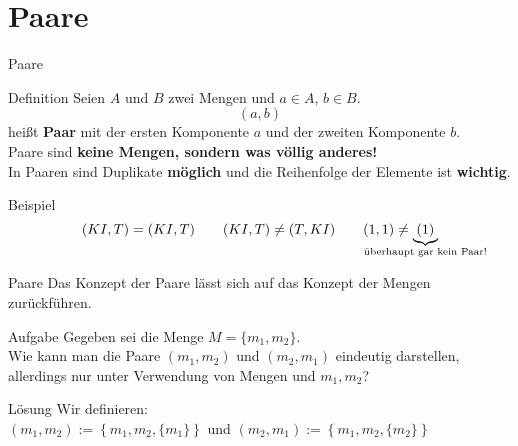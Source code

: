 
\section{Paare}

\begin{frame}{Paare}
	\begin{block}{Definition}
		Seien $A$ und $B$ zwei Mengen und $a \in A$, $b \in B$.\\
		$$(a, b)$$ heißt \textbf{Paar} mit der ersten Komponente $a$ und der zweiten Komponente $b$.\\[1em]
		\pause
		Paare sind \textbf{keine Mengen, sondern was \alert{völlig anderes}!} \\
		In Paaren sind Duplikate \textbf{möglich} und die Reihenfolge der Elemente ist \textbf{wichtig}.\\
	\end{block}

	\pause
	\begin{block}{Beispiel}
		$$ (KI, T) = (KI, T) \qquad (KI, T) \neq (T, KI) \qquad (1, 1) \neq \underbrace{(1)}_{\mathclap{\text{überhaupt gar kein Paar!}}} $$
	\end{block}
\end{frame}

\begin{frame}{Paare}
	Das Konzept der Paare lässt sich auf das Konzept der Mengen zurückführen.
	
	\begin{block}{Aufgabe}
		Gegeben sei die Menge $M = \{m_1, m_2\}$.\\
		Wie kann man die Paare $(m_1, m_2)$ und $(m_2, m_1)$ eindeutig darstellen, allerdings nur unter Verwendung von Mengen und $m_1, m_2$?
	\end{block}
	\pause
	
	\begin{block}{Lösung}
		Wir definieren: \\ 
		$(m_1, m_2) := \left\lbrace m_1, m_2, \{m_1\}\right\rbrace$ und $(m_2, m_1) := \left\lbrace m_1, m_2, \{m_2\}\right\rbrace$
	\end{block}
\end{frame}